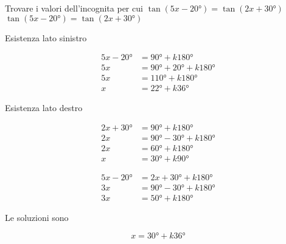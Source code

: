 \begin{exercise}
	Trovare i valori dell'incognita per cui $\tan(5x-\ang{20;;})=\tan(2x+\ang{30;;})$
	\tcblower
	$\tan(5x-\ang{20;;})=\tan(2x+\ang{30;;})$
	
	Esistenza lato sinistro
	
		\begin{align*}
		5x-\ang{20;;}&=\ang{90;;}+k\ang{180;;}\\
		5x&=\ang{90;;}+\ang{20;;}+k\ang{180;;}\\
		5x&=\ang{110;;}+k\ang{180;;}\\
	 x&=\ang{22;;}+k\ang{36;;}
		\end{align*}
	
	Esistenza lato destro
	
	\begin{align*}
	2x+\ang{30;;}&=\ang{90;;}+k\ang{180;;}\\
	2x&=\ang{90;;}-\ang{30;;}+k\ang{180;;}\\
	2x&=\ang{60;;}+k\ang{180;;}\\
	x&=\ang{30;;}+k\ang{90;;}
	\end{align*}
	
	
	\begin{align*}
	5x-\ang{20;;}&=2x+\ang{30;;}+k\ang{180;;}\\
	3x&=\ang{90;;}-\ang{30;;}+k\ang{180;;}\\
	3x&=\ang{50;;}+k\ang{180;;}
	\end{align*}
	
	Le soluzioni sono
	
\[x =\ang{30;;}+k\ang{36;;}\]
\end{exercise}
